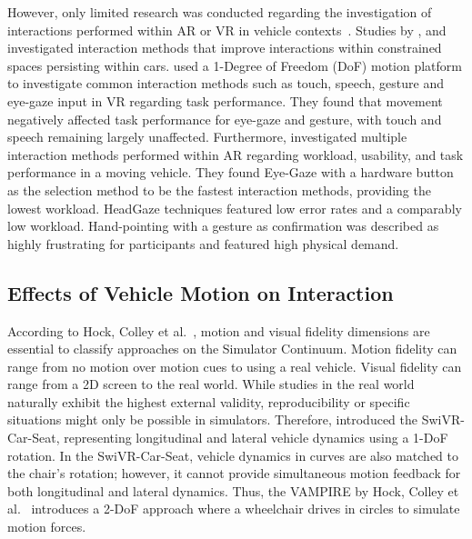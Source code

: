 However, only limited research was conducted regarding the investigation of interactions performed within AR or VR in vehicle contexts~\cite{schramm2023AssessingAugmentedReality, colleySwiVRCarSeatExploringVehicle2021, kariHandyCastPhonebasedBimanual2023, tsengFingerMapperMappingFinger2023}. Studies by \citet{tsengFingerMapperMappingFinger2023}, and \citet{kariHandyCastPhonebasedBimanual2023} investigated interaction methods that improve interactions within constrained spaces persisting within cars. 
\citet{colleySwiVRCarSeatExploringVehicle2021} used a 1-Degree of Freedom (DoF) motion platform to investigate common interaction methods such as touch, speech, gesture and eye-gaze input in VR regarding task performance. They found that movement negatively affected task performance for eye-gaze and gesture, with touch and speech remaining largely unaffected. Furthermore, \citet{schramm2023AssessingAugmentedReality} investigated multiple interaction methods performed within AR regarding workload, usability, and task performance in a moving vehicle. They found Eye-Gaze with a hardware button as the selection method to be the fastest interaction methods, providing the lowest workload. HeadGaze techniques featured low error rates and a comparably low workload. Hand-pointing with a gesture as confirmation was described as highly frustrating for participants and featured high physical demand.




\subsection{Effects of Vehicle Motion on Interaction}

According to Hock, Colley et al.~\cite{hock2022introducing}, motion and visual fidelity dimensions are essential to classify approaches on the Simulator Continuum. Motion fidelity can range from no motion over motion cues to using a real vehicle. Visual fidelity can range from a 2D screen to the real world. While studies in the real world naturally exhibit the highest external validity, reproducibility or specific situations might only be possible in simulators. Therefore, \citet{colleySwiVRCarSeatExploringVehicle2021} introduced the SwiVR-Car-Seat, representing longitudinal and lateral vehicle dynamics using a 1-DoF rotation. In the SwiVR-Car-Seat, vehicle dynamics in curves are also matched to the chair’s rotation; however, it cannot provide simultaneous motion feedback for both longitudinal and lateral dynamics. Thus, the VAMPIRE by Hock, Colley et al.~\cite{hock2022introducing} introduces a 2-DoF approach where a wheelchair drives in circles to simulate motion forces.

